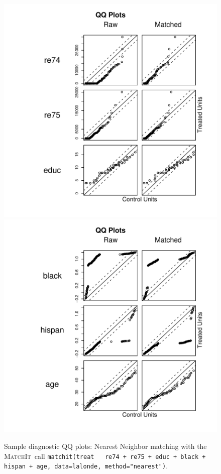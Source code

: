 \documentclass[oneside,letterpaper,titlepage]{article}
\newcommand{\MatchIt}{\textsc{MatchIt}}
\begin{document}
\begin{enumerate}
\begin{figure}[tbp]
  \begin{center}
    \includegraphics[scale=0.25]{figs/qqplotnn}
    \includegraphics[scale=0.25]{figs/qqplotnn2} 
    \hfill
    \caption{Sample diagnostic QQ plots: Nearest Neighbor matching
      with the \MatchIt\ call \texttt{matchit(treat ~ re74 + re75 + educ
        + black + hispan + age, data=lalonde, method="nearest")}.}
\label{diagqqnn}
\end{center}
\end{figure}


\end{enumerate}
\end{document}
